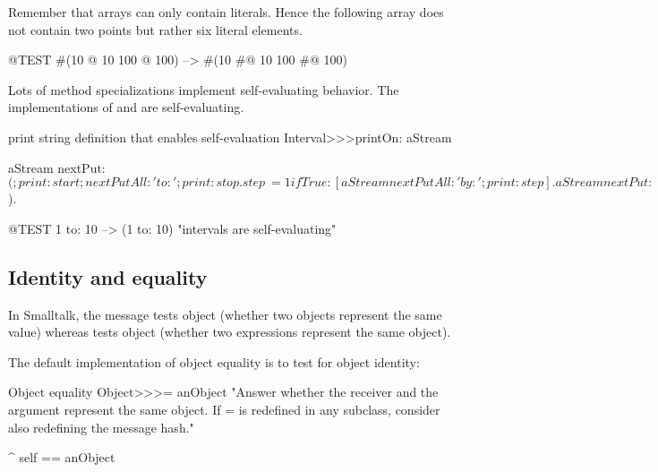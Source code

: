 \documentclass[a4paper,10pt,twoside]{book}
\begin{document}
Remember that  arrays can only contain literals.
Hence the following array does not contain two points but rather six literal elements.
\begin{code}{@TEST}
#(10 @ 10 100 @ 100) --> #(10 #@ 10 100 #@ 100)
\end{code}

Lots of  method specializations implement self-evaluating behavior.
The implementations of  and  are self-evaluating.


\begin{method}{ print string definition that enables self-evaluation}
Interval>>>printOn: aStream

    aStream nextPut: $(;
        print: start;
        nextPutAll: ' to: ';
        print: stop.
    step ~= 1 ifTrue: [aStream nextPutAll: ' by: '; print: step].
    aStream nextPut: $).
\end{method}

\begin{code}{@TEST}
1 to: 10 --> (1 to: 10)    "intervals are self-evaluating"
\end{code}

\subsection{Identity and equality}

In Smalltalk, the message \ct{=} tests object  (\ie whether two objects represent the same value) whereas \ct{==} tests object  (\ie whether two expressions represent the same object).

The default implementation of object equality is to test for object identity:
\begin{method}{Object equality}
Object>>>= anObject
    "Answer whether the receiver and the argument represent the same object.
    If = is redefined in any subclass, consider also redefining the message hash."

    ^ self == anObject
\end{method}
\end{document}
